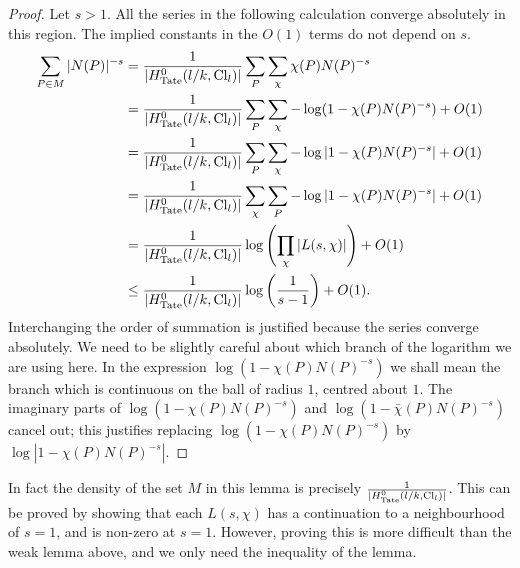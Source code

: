 \begin{proof}
	Let $s > 1$. All the series in the following calculation converge absolutely in this region.
	The implied constants in the $O(1)$ terms do not depend on $s$.
	\begin{align*}
		\sum_{P \in M} |N(P)|^{-s}
		&= \frac{1}{|H^0_{\mathrm{Tate}}(l/k,\mathrm{Cl}_l)|} \sum_P \sum_\chi \chi(P) N(P)^{-s}\\
		&= \frac{1}{|H^0_{\mathrm{Tate}}(l/k,\mathrm{Cl}_l)|}
		\sum_P \sum_\chi -\log(1-\chi(P) N(P)^{-s}) + O(1)\\
		&= \frac{1}{|H^0_{\mathrm{Tate}}(l/k,\mathrm{Cl}_l)|}
		\sum_P \sum_\chi -\log |1-\chi(P) N(P)^{-s}| + O(1)\\
		&= \frac{1}{|H^0_{\mathrm{Tate}}(l/k,\mathrm{Cl}_l)|}
		\sum_\chi \sum_P -\log |1-\chi(P) N(P)^{-s}| + O(1)\\
		&= \frac{1}{|H^0_{\mathrm{Tate}}(l/k,\mathrm{Cl}_l)|} \log \left(\prod_\chi |L(s,\chi)| \right) + O(1)\\
		&\le \frac{1}{|H^0_{\mathrm{Tate}}(l/k,\mathrm{Cl}_l)|} \log \left(\frac{1}{s-1}\right) + O(1).
	\end{align*}
	Interchanging the order of summation is justified because the series converge absolutely.
	We need to be slightly careful about which branch of the logarithm we are using here.
	In the expression $\log(1-\chi(P) N(P)^{-s})$ we shall mean the branch which is continuous
	on the ball of radius $1$, centred about $1$.
	The imaginary parts of $\log(1-\chi(P) N(P)^{-s})$ and $\log(1-\bar \chi(P) N(P)^{-s})$
	cancel out; this justifies replacing $\log(1-\chi(P) N(P)^{-s})$ by $\log |1-\chi(P) N(P)^{-s}|$.
\end{proof}

\begin{remark}
	In fact the density of the set $M$ in this lemma is precisely $\frac{1}{|H^0_{\mathrm{Tate}}(l/k,\mathrm{Cl}_l)|}$.
	This can be proved by showing that each $L(s,\chi)$ has a continuation to a neighbourhood
	of $s=1$, and is non-zero at $s=1$.
	However, proving this is more difficult than the weak lemma above, and we only need the inequality
	of the lemma.
\end{remark}








